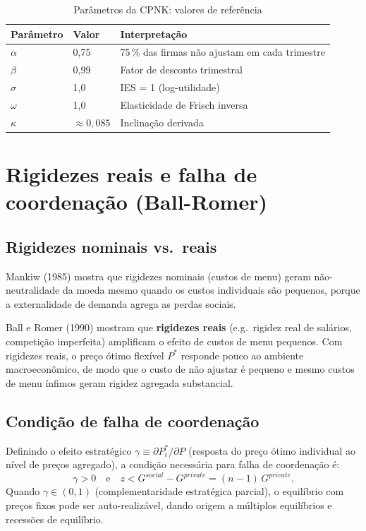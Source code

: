 \documentclass[11pt,a4paper]{article}
\begin{document}
\begin{table}[h!]
\centering
\caption{Parâmetros da CPNK: valores de referência}
\begin{tabular}{lll}
\toprule
Parâmetro & Valor & Interpretação \\
\midrule
$\alpha$  & 0,75  & 75\,\% das firmas não ajustam em cada trimestre \\
$\beta$   & 0,99  & Fator de desconto trimestral \\
$\sigma$  & 1,0   & IES = 1 (log-utilidade) \\
$\omega$  & 1,0   & Elasticidade de Frisch inversa \\
$\kappa$  & $\approx 0,085$ & Inclinação derivada \\
\bottomrule
\end{tabular}
\end{table}

\section{Rigidezes reais e falha de coordenação (Ball-Romer)}

\subsection{Rigidezes nominais vs.\ reais}

Mankiw (1985) mostra que rigidezes nominais (custos de menu) geram
não-neutralidade da moeda mesmo quando os custos individuais são pequenos,
porque a externalidade de demanda agrega as perdas sociais.

Ball e Romer (1990) mostram que \textbf{rigidezes reais} (e.g.\ rigidez real
de salários, competição imperfeita) amplificam o efeito de custos de menu
pequenos.  Com rigidezes reais, o preço ótimo flexível $P^*$ responde pouco
ao ambiente macroeconômico, de modo que o custo de não ajustar é pequeno e
mesmo custos de menu ínfimos geram rigidez agregada substancial.

\subsection{Condição de falha de coordenação}

Definindo o efeito estratégico $\gamma \equiv \partial P_i^*/\partial P$
(resposta do preço ótimo individual ao nível de preços agregado), a condição
necessária para falha de coordenação é:
\begin{equation}
  \gamma > 0 \quad \text{e} \quad z < G^{social} - G^{private} = (n-1)\,G^{private}.
\end{equation}
Quando $\gamma \in (0,1)$ (complementaridade estratégica parcial), o
equilíbrio com preços fixos pode ser auto-realizável, dando origem a
múltiplos equilíbrios e recessões de equilíbrio.
\end{document}
